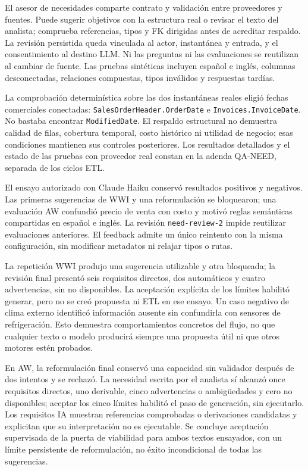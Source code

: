\documentclass[11pt,letterpaper]{article}
\newcommand{\file}[1]{\texttt{#1}}
\begin{document}
El asesor de necesidades comparte contrato y validación entre proveedores y fuentes.
Puede sugerir objetivos con la estructura real o revisar el texto del analista;
comprueba referencias, tipos y FK dirigidas antes de acreditar respaldo. La revisión
persistida queda vinculada al actor, instantánea y entrada, y el consentimiento al
destino LLM. Ni las preguntas ni las evaluaciones se reutilizan al cambiar de fuente.
Las pruebas sintéticas incluyen español e inglés, columnas desconectadas, relaciones
compuestas, tipos inválidos y respuestas tardías.

La comprobación determinística sobre las dos instantáneas reales eligió fechas
comerciales conectadas: \file{SalesOrderHeader.OrderDate} e \file{Invoices.InvoiceDate}.
No bastaba encontrar \file{ModifiedDate}. El respaldo estructural no demuestra calidad
de filas, cobertura temporal, costo histórico ni utilidad de negocio; esas condiciones
mantienen sus controles posteriores. Los resultados detallados y el estado de las
pruebas con proveedor real constan en la adenda QA-NEED, separada de los ciclos ETL.

El ensayo autorizado con Claude Haiku conservó resultados positivos y negativos. Las
primeras sugerencias de WWI y una reformulación se bloquearon; una evaluación AW
confundió precio de venta con costo y motivó reglas semánticas compartidas en español
e inglés. La revisión \file{need-review-2} impide reutilizar evaluaciones anteriores.
El feedback admite un único reintento con la misma configuración, sin modificar
metadatos ni relajar tipos o rutas.

La repetición WWI produjo una sugerencia utilizable y otra bloqueada; la revisión
final presentó seis requisitos directos, dos automáticos y cuatro advertencias, sin
no disponibles. La aceptación explícita de los límites habilitó generar, pero no se
creó propuesta ni ETL en ese ensayo. Un caso negativo de clima externo identificó
información ausente sin confundirla con sensores de refrigeración. Esto demuestra
comportamientos concretos del flujo, no que cualquier texto o modelo producirá siempre
una propuesta útil ni que otros motores estén probados.

En AW, la reformulación final conservó una capacidad sin validador después de dos
intentos y se rechazó. La necesidad escrita por el analista sí alcanzó once requisitos
directos, uno derivable, cinco advertencias o ambigüedades y cero no disponibles;
aceptar los cinco límites habilitó el paso de generación, sin ejecutarlo. Los requisitos
IA muestran referencias comprobadas o derivaciones candidatas y explicitan que su
interpretación no es ejecutable. Se concluye aceptación supervisada de la puerta de
viabilidad para ambos textos ensayados, con un límite persistente de reformulación,
no éxito incondicional de todas las sugerencias.
\end{document}
